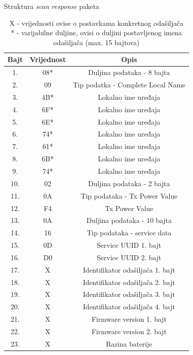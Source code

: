 \begin{table}[H]
    \centering
    \caption{Struktura \textit{scan response} paketa}
    \label{tbl:scanResponse}
    \begin{tabular}{ccc}
    \hline 
    Bajt & Vrijednost & Opis \\ 
    \hline 
    1. & 08* & Duljina podataka - 8 bajta \\ 
    2. & 09 & Tip podatka - Complete Local Name \\ 
    3. & 4B* & Lokalno ime uređaja \\ 
    4. & 6F* & Lokalno ime uređaja \\ 
    5. & 6E* & Lokalno ime uređaja \\ 
    6. & 74* & Lokalno ime uređaja \\ 
    7. & 61* & Lokalno ime uređaja \\ 
    8. & 6B* & Lokalno ime uređaja \\ 
    9. & 74* & Lokalno ime uređaja \\ 
    10. & 02 & Duljina podataka - 2 bajta \\ 
    11. & 0A & Tip podataka - Tx Power Value \\ 
    12. & F4 & Tx Power Value \\ 
    13. & 0A & Duljina podataka - 10 bajta \\ 
    14. & 16 & Tip podataka - service data \\ 
    15. & 0D & Service UUID 1. bajt \\ 
    16. & D0 & Service UUID 2. bajt \\ 
    17. & X & Identifikator odašiljača 1. bajt \\ 
    18. & X & Identifikator odašiljača 2. bajt \\ 
    19. & X & Identifikator odašiljača 3. bajt \\ 
    20. & X & Identifikator odašiljača 4. bajt \\ 
    21. & X & Firmware version 1. bajt \\ 
    22. & X & Firmware version 2. bajt \\ 
    23. & X & Razina baterije \\ 
    \hline
    \end{tabular}
    \caption*{
        X - vrijednosti ovise o postavkama konkretnog odašiljača \\
        * - varijabilne duljine, ovisi o duljini postavljenog imena odašiljača (max. 15 bajtova)
    } 
\end{table}